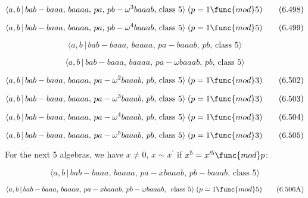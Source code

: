 \documentclass[10pt]{article}
\begin{document}
\begin{equation}
\langle a,b\,|\,bab-baaa,\,baaaa,\,pa,\,pb-\omega ^3baaab,\,\text{class }%
5\rangle\;(p=1 \func{mod} 5)  \tag{6.498}
\end{equation}

\begin{equation}
\langle a,b\,|\,bab-baaa,\,baaaa,\,pa,\,pb-\omega ^4baaab,\,\text{class }%
5\rangle\;(p=1 \func{mod} 5)  \tag{6.499}
\end{equation}

\begin{equation}
\langle a,b\,|\,bab-baaa,\,baaaa,\,pa-baaab,\,pb,\,\text{class }5\rangle 
\tag{6.500}
\end{equation}

\begin{equation}
\langle a,b\,|\,bab-baaa,\,baaaa,\,pa-\omega baaab,\,pb,\,\text{class }%
5\rangle  \tag{6.501}
\end{equation}

\begin{equation}
\langle a,b\,|\,bab-baaa,\,baaaa,\,pa-\omega ^2baaab,\,pb,\,\text{class }%
5\rangle\;(p=1 \func{mod} 3)  \tag{6.502}
\end{equation}

\begin{equation}
\langle a,b\,|\,bab-baaa,\,baaaa,\,pa-\omega ^3baaab,\,pb,\,\text{class }%
5\rangle\;(p=1 \func{mod} 3)  \tag{6.503}
\end{equation}

\begin{equation}
\langle a,b\,|\,bab-baaa,\,baaaa,\,pa-\omega ^4baaab,\,pb,\,\text{class }%
5\rangle\;(p=1 \func{mod} 3)  \tag{6.504}
\end{equation}

\begin{equation}
\langle a,b\,|\,bab-baaa,\,baaaa,\,pa-\omega ^{5}baaab,\,pb,\,\text{class }%
5\rangle \;(p=1\func{mod}3)  \tag{6.505}
\end{equation}

For the next 5 algebras, we have $x\neq 0,\,x\sim x^{\prime }$ if $%
x^{5}=x^{\prime 5}\func{mod}p$:

\begin{equation}
\langle a,b\,|\,bab-baaa,\,baaaa,\,pa-xbaaab,\,pb-baaab,\,\text{class }%
5\rangle  \tag{6.506}
\end{equation}

\begin{equation}
\langle a,b\,|\,bab-baaa,\,baaaa,\,pa-xbaaab,\,pb-\omega baaab,\,\text{
class }5\rangle \;(p=1\func{mod}5)  \tag{6.506A}
\end{equation}
\end{document}
